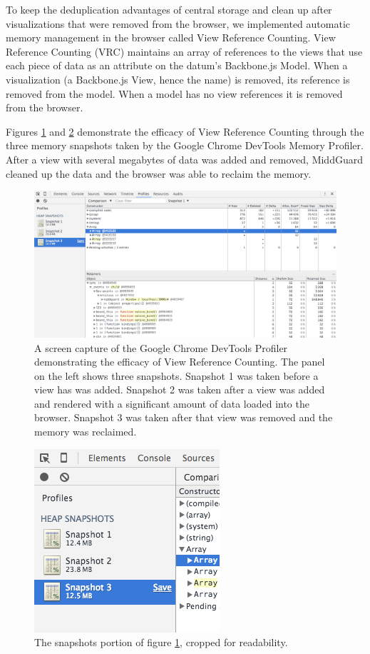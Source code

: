 \documentclass[midd]{thesis}
\begin{document}
To keep the deduplication advantages of central storage and clean up after
visualizations that were removed from the browser, we implemented automatic
memory management in the browser called View Reference Counting. View Reference
Counting (VRC) maintains an array of references to the views that use each piece
of data as an attribute on the datum's Backbone.js Model. When a visualization
(a Backbone.js View, hence the name) is removed, its reference is removed from
the model. When a model has no view references it is removed from the browser.

Figures \ref{fig:vrc} and \ref{fig:vrccropped} demonstrate the efficacy of View
Reference Counting through the three memory snapshots taken by the Google Chrome
DevTools Memory Profiler. After a view with several megabytes of data was added
and removed, MiddGuard cleaned up the data and the browser was able to reclaim
the memory.

\begin{figure}[!ht]
  \centering
  \includegraphics[width=1\textwidth]{devtools-snapshot}
  \caption{A screen capture of the Google Chrome DevTools Profiler demonstrating
  the efficacy of View Reference Counting. The panel on the left shows three
  snapshots. Snapshot 1 was taken before a view has was added. Snapshot 2 was
  taken after a view was added and rendered with a significant amount of data
  loaded into the browser. Snapshot 3 was taken after that view was removed and
  the memory was reclaimed.}
  \label{fig:vrc}
\end{figure}

\begin{figure}[!ht]
  \centering
  \includegraphics{devtools-snapshot-cropped}
  \caption{The snapshots portion of figure \ref{fig:vrc}, cropped for
  readability.}
  \label{fig:vrccropped}
\end{figure}
\end{document}
